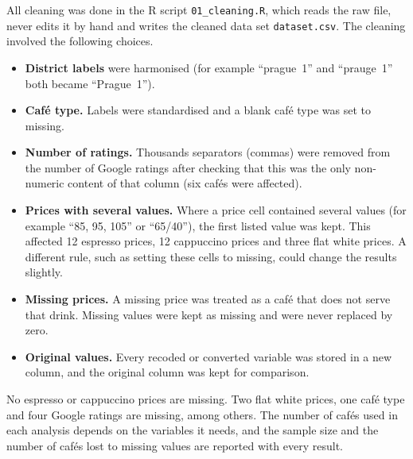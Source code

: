 \documentclass[11pt,a4paper]{article}
\begin{document}
All cleaning was done in the R script \texttt{01\_cleaning.R}, which reads the raw file, never edits it by hand and writes the cleaned data set \texttt{dataset.csv}. The cleaning involved the following choices.
\begin{itemize}
  \item \textbf{District labels} were harmonised (for example ``prague~1'' and ``prauge~1'' both became ``Prague~1'').
  \item \textbf{Caf\'e type.} Labels were standardised and a blank caf\'e type was set to missing.
  \item \textbf{Number of ratings.} Thousands separators (commas) were removed from the number of Google ratings after checking that this was the only non-numeric content of that column (six caf\'es were affected).
  \item \textbf{Prices with several values.} Where a price cell contained several values (for example ``85, 95, 105'' or ``65/40''), the first listed value was kept. This affected 12 espresso prices, 12 cappuccino prices and three flat white prices. A different rule, such as setting these cells to missing, could change the results slightly.
  \item \textbf{Missing prices.} A missing price was treated as a caf\'e that does not serve that drink. Missing values were kept as missing and were never replaced by zero.
  \item \textbf{Original values.} Every recoded or converted variable was stored in a new column, and the original column was kept for comparison.
\end{itemize}

No espresso or cappuccino prices are missing. Two flat white prices, one caf\'e type and four Google ratings are missing, among others. The number of caf\'es used in each analysis depends on the variables it needs, and the sample size and the number of caf\'es lost to missing values are reported with every result.
\end{document}
